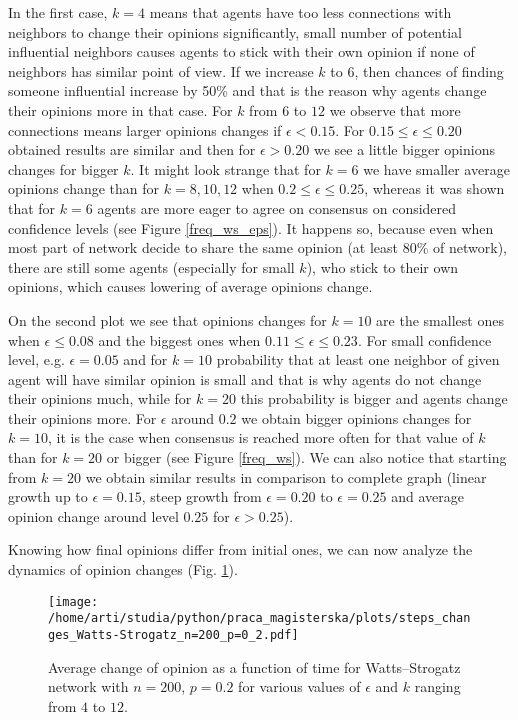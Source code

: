 \documentclass[a4paper, 12pt]{article}
\begin{document}
In the first case, $k=4$ means that agents have too less connections with neighbors to change their opinions significantly, small number of potential influential neighbors causes agents to stick with their own opinion if none of neighbors has similar point of view. If we increase $k$ to $6$, then chances of finding someone influential increase by 50\% and that is the reason why agents change their opinions more in that case. For $k$ from $6$ to $12$ we observe that more connections means larger opinions changes if $\epsilon < 0.15$. For $0.15 \leq \epsilon \leq 0.20$ obtained results are similar and then for $\epsilon > 0.20$ we see a little bigger opinions changes for bigger $k$. It might look strange that for $k=6$ we have smaller average opinions change than for $k=8, 10, 12$ when $0.2 \leq \epsilon \leq 0.25$, whereas it was shown that for $k=6$ agents are more eager to agree on consensus on considered confidence levels (see Figure \ref{freq_ws_eps}). It happens so, because even when most part of network decide to share the same opinion (at least 80\% of network), there are still some agents (especially for small $k$), who stick to their own opinions, which causes lowering of average opinions change.
\indent

On the second plot we see that opinions changes for $k=10$ are the smallest ones when $\epsilon \leq 0.08$ and the biggest ones when $0.11 \leq \epsilon \leq 0.23$. For small confidence level, e.g. $\epsilon=0.05$ and for $k=10$ probability that at least one neighbor of given agent will have similar opinion is small and that is why agents do not change their opinions much, while for $k=20$ this probability is bigger and agents change their opinions more. For $\epsilon$ around $0.2$ we obtain bigger opinions changes for $k=10$, it is the case when consensus is reached more often for that value of $k$ than for $k=20$ or bigger (see Figure \ref{freq_ws}). We can also notice that starting from $k=20$ we obtain similar results in comparison to complete graph (linear growth up to $\epsilon=0.15$, steep growth from $\epsilon=0.20$ to $\epsilon=0.25$ and average opinion change around level $0.25$ for $\epsilon>0.25$).

\indent

Knowing how final opinions differ from initial ones, we can now analyze the dynamics of opinion changes (Fig. \ref{f18}).

\begin{figure}[H]
		\centering
		\texttt{[image: /home/arti/studia/python/praca\_magisterska/plots/steps\_changes\_Watts-Strogatz\_n=200\_p=0\_2.pdf]}
		\caption{Average change of opinion as a function of time for Watts--Strogatz network with $n=200$, $p=0.2$ for various values of $\epsilon$ and $k$ ranging from $4$ to $12$.}
		\label{f18}
\end{figure}
\end{document}
